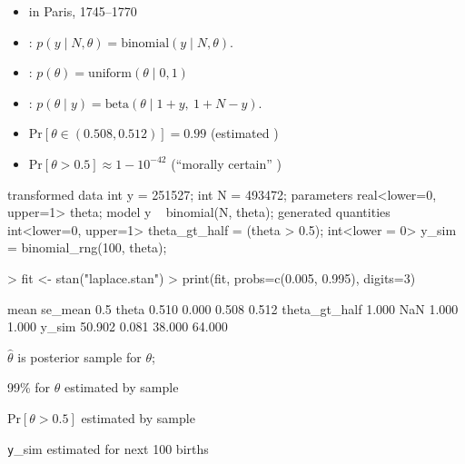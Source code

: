 \documentclass[10pt]{report}
\begin{document}

\begin{itemize}
\item {} in Paris, 1745--1770
\item {}:
$p(y \mid N, \theta)
 = \textrm{binomial}(y \mid N, \theta).$
\item {}:
$p(\theta)
 = \textrm{uniform}(\theta \mid 0, 1)$
\item {}:
$p(\theta \mid y)
 = \textrm{beta}(\theta \mid 1 + y, \ 1 + N - y).$
\vfill
\item {$\textrm{Pr}[\theta \in (0.508, 0.512)] = 0.99$}
\hfill {\small (estimated )}
\item {$\textrm{Pr}[\theta > 0.5] \approx 1 - 10^{-42}$}
\hfill {\small (``morally certain'' )}
\end{itemize}

\begin{stancode}
transformed data {
  int y = 251527;  int N = 493472;
}
parameters {
  real<lower=0, upper=1> theta;
}
model {
  y ~ binomial(N, theta);
}
generated quantities {
  int<lower=0, upper=1> theta_gt_half = (theta > 0.5);
  int<lower = 0> y_sim = binomial_rng(100, theta);
}
\end{stancode}

%
\begin{codein}
> fit <- stan("laplace.stan")
> print(fit, probs=c(0.005, 0.995), digits=3)
\end{codein}
\begin{codeout}
                     mean se_mean   0.5%
theta               0.510   0.000  0.508   0.512
theta_gt_half       1.000     NaN  1.000   1.000
y_sim              50.902   0.081 38.000  64.000
\end{codeout}
%
\begin{subitemize}
\item {} $\hat{\theta}$ is posterior sample  for $\theta$;
\item 99\%  for $\theta$ estimated by sample 
\item $\textrm{Pr}[\theta > 0.5]$ estimated by sample 
\item {\texttt y\_sim} estimated  for next 100 births
\end{subitemize}
\end{document}
